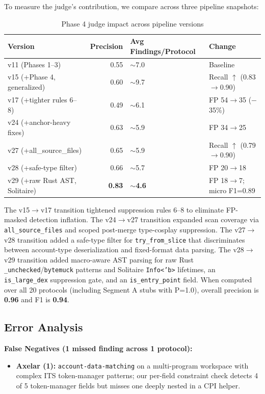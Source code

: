 \documentclass{article}
\begin{document}
To measure the judge's contribution, we compare across three pipeline snapshots:

\begin{table}[H]
  \caption{Phase 4 judge impact across pipeline versions}
  \label{tab:judge_impact}
  \centering
  \begin{tabular}{lrll}
    \toprule
    Version & Precision & Avg Findings/Protocol & Change \\
    \midrule
    v11 (Phases 1--3) & 0.55 & $\sim$7.0 & Baseline \\
    v15 (+Phase 4, generalized) & 0.60 & $\sim$9.7 & Recall $\uparrow$ (0.83$\to$0.90) \\
    v17 (+tighter rules 6--8) & 0.49 & $\sim$6.1 & FP 54$\to$35 ($-$35\%) \\
    v24 (+anchor-heavy fixes) & 0.63 & $\sim$5.9 & FP 34$\to$25 \\
    v27 (+all\_source\_files) & 0.65 & $\sim$5.9 & Recall $\uparrow$ (0.79$\to$0.90) \\
    v28 (+safe-type filter) & 0.66 & $\sim$5.7 & FP 20$\to$18 \\
    v29 (+raw Rust AST, Solitaire) & \textbf{0.83} & $\sim$\textbf{4.6} & FP 18$\to$7; micro F1=0.89 \\
    \bottomrule
  \end{tabular}
\end{table}

The v15$\to$v17 transition tightened suppression rules 6--8 to eliminate FP-masked detection inflation. The v24$\to$v27 transition expanded scan coverage via \texttt{all\_source\_files} and scoped post-merge type-cosplay suppression. The v27$\to$v28 transition added a safe-type filter for \texttt{try\_from\_slice} that discriminates between account-type deserialization and fixed-format data parsing. The v28$\to$v29 transition added macro-aware AST parsing for raw Rust \texttt{\_unchecked}/\texttt{bytemuck} patterns and Solitaire \texttt{Info<'b>} lifetimes, an \texttt{is\_large\_dex} suppression gate, and an \texttt{is\_entry\_point} field. When computed over all 20 protocols (including Segment A stubs with P=1.0), overall precision is \textbf{0.96} and F1 is \textbf{0.94}.

\subsection{Error Analysis}
\label{sec:error}

\textbf{False Negatives (1 missed finding across 1 protocol):}
\begin{itemize}
  \item \textbf{Axelar (1):} \texttt{account-data-matching} on a multi-program workspace with complex ITS token-manager patterns; our per-field constraint check detects 4 of 5 token-manager fields but misses one deeply nested in a CPI helper.
\end{itemize}
\end{document}
